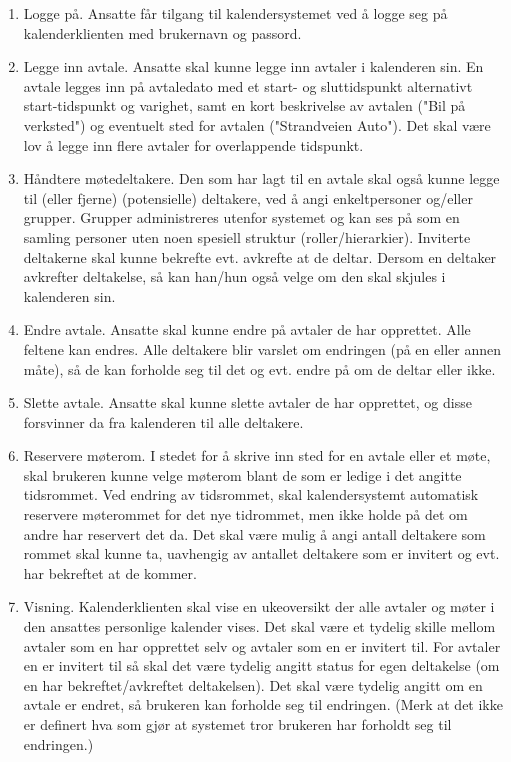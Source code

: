 \begin{enumerate}

\item
Logge på. Ansatte får tilgang til kalendersystemet ved å logge seg på kalenderklienten med brukernavn og passord.

\item
Legge inn avtale. Ansatte skal kunne legge inn avtaler i kalenderen sin. En avtale legges inn på avtaledato med et start- og sluttidspunkt alternativt start-tidspunkt og varighet, samt en kort beskrivelse av avtalen ("Bil på verksted") og eventuelt sted for avtalen ("Strandveien Auto"). Det skal være lov å legge inn flere avtaler for overlappende tidspunkt.

\item
Håndtere møtedeltakere. Den som har lagt til en avtale skal også kunne legge til (eller fjerne) (potensielle) deltakere, ved å angi enkeltpersoner og/eller grupper. Grupper administreres utenfor systemet og kan ses på som en samling personer uten noen spesiell struktur (roller/hierarkier). Inviterte deltakerne skal kunne bekrefte evt. avkrefte at de deltar. Dersom en deltaker avkrefter deltakelse, så kan han/hun også velge om den skal skjules i kalenderen sin.

\item
Endre avtale. Ansatte skal kunne endre på avtaler de har opprettet. Alle feltene kan endres. Alle deltakere blir varslet om endringen (på en eller annen måte), så de kan forholde seg til det og evt. endre på om de deltar eller ikke.

\item
Slette avtale. Ansatte skal kunne slette avtaler de har opprettet, og disse forsvinner da fra kalenderen til alle deltakere.

\item
Reservere møterom. I stedet for å skrive inn sted for en avtale eller et møte, skal brukeren kunne velge møterom blant de som er ledige i det angitte tidsrommet. Ved endring av tidsrommet, skal kalendersystemt automatisk reservere møterommet for det nye tidrommet, men ikke holde på det om andre har reservert det da. Det skal være mulig å angi antall deltakere som rommet skal kunne ta, uavhengig av antallet deltakere som er invitert og evt. har bekreftet at de kommer.

\item
Visning. Kalenderklienten skal vise en ukeoversikt der alle avtaler og møter i den ansattes personlige kalender vises. Det skal være et tydelig skille mellom avtaler som en har opprettet selv og avtaler som en er invitert til. For avtaler en er invitert til så skal det være tydelig angitt status for egen deltakelse (om en har bekreftet/avkreftet deltakelsen). Det skal være tydelig angitt om en avtale er endret, så brukeren kan forholde seg til endringen. (Merk at det ikke er definert hva som gjør at systemet tror brukeren har forholdt seg til endringen.)


\end{enumerate}
